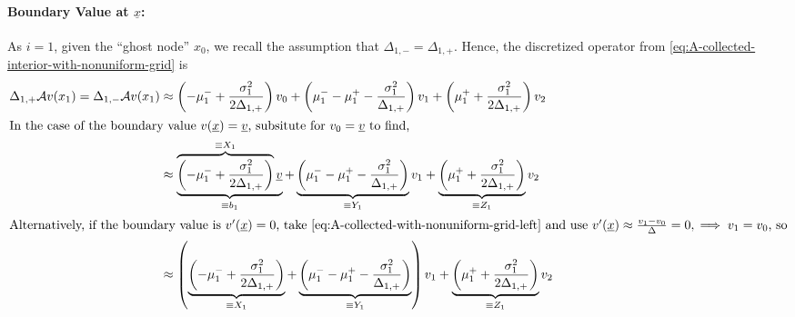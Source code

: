 \documentclass[11pt]{etk-article}
\begin{document}
\paragraph{Boundary Value at $\underline{x}$:}
As $i =1$, given the ``ghost node'' $x_0$, we recall the assumption that $\Delta_{1,-} = \Delta_{1,+}$.  Hence, the discretized operator from \cref{eq:A-collected-interior-with-nonuniform-grid} is
\begin{align}
\Delta_{1,+}\mathcal{A} v(x_1) = \Delta_{1,-}\mathcal{A} v(x_1) &\approx \left(-\mu_1^{-} +\frac{\sigma_1^2}{2 \Delta_{1,+}}\right)v_0 + \left(\mu_1^{-} - \mu_1^{+}-\frac{\sigma_1^2}{\Delta_{1,+}}\right) v_1 + \left(\mu_1^{+} + \frac{\sigma_1^2}{2 \Delta_{1,+}}\right)v_2\label{eq:A-collected-with-nonuniform-grid-left}\\
\intertext{In the case of the boundary value $v(\underline{x}) = \underline{v}$, subsitute for $v_0 =  \underline{v}$ to find,}
&\approx \underbrace{\overbrace{\left(-\mu_1^{-} +\frac{\sigma_1^2}{2 \Delta_{1,+}}\right)}^{\equiv X_1}\underline{v}}_{\equiv b_1} +  \underbrace{\left(\mu_1^{-} - \mu_1^{+}-\frac{\sigma_1^2}{\Delta_{1,+}}\right)}_{\equiv Y_1}v_1 + \underbrace{\left(\mu_1^{+} + \frac{\sigma_1^2}{2 \Delta_{1,+}}\right)}_{\equiv Z_1}v_2\\
\intertext{Alternatively, if the boundary value is $v'(\underline{x}) = 0$, take \cref{eq:A-collected-with-nonuniform-grid-left} and use $v'(\underline{x}) \approx \frac{v_1-v_0}{\Delta} = 0, \implies v_1 = v_0$, so}
 &\approx \left(\underbrace{\left(-\mu_1^{-} +\frac{\sigma_1^2}{2 \Delta_{1,+}}\right)}_{\equiv X_1} + \underbrace{\left(\mu_1^{-} - \mu_1^{+}-\frac{\sigma_1^2}{\Delta_{1,+}}\right)}_{\equiv Y_1}\right)v_1 + \underbrace{\left(\mu_1^{+} + \frac{\sigma_1^2}{2 \Delta_{1,+}}\right)}_{\equiv Z_1}v_2\label{eq:reflecting-left-nonuniform}
\end{align}
\end{document}
